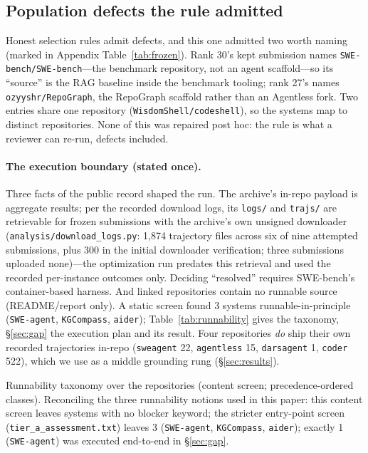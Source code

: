 \documentclass[11pt]{article}
\begin{document}
\subsection{Population defects the rule admitted}
\label{sec:defects}
Honest selection rules admit defects, and this one admitted two worth naming
(marked in Appendix Table~\ref{tab:frozen}). Rank 30's kept submission names
\texttt{SWE-bench/SWE-bench}---the benchmark repository, not an agent
scaffold---so its ``source'' is the RAG baseline inside the benchmark tooling;
rank 27's names \texttt{ozyyshr/RepoGraph}, the RepoGraph scaffold rather
than an Agentless fork. Two entries share one repository
(\texttt{WisdomShell/codeshell}), so the \swN{} systems map to
\swDistinctRepos{} distinct repositories. None of this was repaired post
hoc: the rule is what a reviewer can re-run, defects included.

\paragraph{The execution boundary (stated once).}
Three facts of the public record shaped the run. The archive's in-repo
payload is aggregate results; per the recorded download logs, its
\texttt{logs/} and \texttt{trajs/} are retrievable for frozen submissions
with the archive's own unsigned downloader
(\texttt{analysis/download\_logs.py}: 1{,}874 trajectory files across six of
nine attempted submissions, plus 300 in the initial downloader verification;
three submissions uploaded none)---the
optimization run predates this retrieval and used the recorded per-instance
outcomes only. Deciding ``resolved'' requires SWE-bench's container-based
harness. And \swNoSource{} linked repositories contain no runnable source
(README/report only). A static screen found 3 systems
runnable-in-principle (\texttt{SWE-agent}, \texttt{KGCompass}, \texttt{aider});
Table~\ref{tab:runnability} gives the taxonomy, \S\ref{sec:gap} the execution
plan and its result. Four repositories \emph{do} ship their own recorded
trajectories in-repo (\texttt{sweagent} 22, \texttt{agentless} 15,
\texttt{darsagent} 1, \texttt{coder} 522), which we use as a middle
grounding rung (\S\ref{sec:results}).

\begin{table}[t]\centering
\caption{Runnability taxonomy over the \swN{} repositories (content screen;
precedence-ordered classes). Reconciling the three runnability notions used in
this paper: this content screen leaves \swClean{} systems with no blocker
keyword; the stricter entry-point screen (\texttt{tier\_a\_assessment.txt})
leaves 3 (\texttt{SWE-agent}, \texttt{KGCompass}, \texttt{aider}); exactly
1 (\texttt{SWE-agent}) was executed end-to-end in \S\ref{sec:gap}.}
\label{tab:runnability}\footnotesize
\begin{adjustbox}{max width=\linewidth,center}\end{adjustbox}
\end{table}
\end{document}

